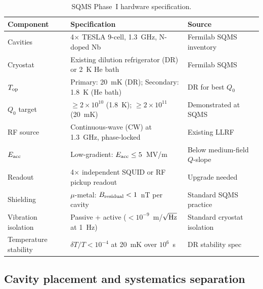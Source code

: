 \documentclass[11pt]{article}
\newcommand{\ee}[1]{\times 10^{#1}}
\theoremstyle{definition}
\theoremstyle{remark}
\begin{document}
\begin{table}[H]
\centering
\caption{SQMS Phase~I hardware specification.}
\label{tab:phase1_hardware}
\renewcommand{\arraystretch}{1.2}
\begin{tabular}{@{}lll@{}}
\toprule
\textbf{Component} & \textbf{Specification} & \textbf{Source} \\
\midrule
Cavities & 4$\times$ TESLA 9-cell, 1.3~GHz, N-doped Nb &
  Fermilab SQMS inventory \\
Cryostat & Existing dilution refrigerator (DR) or 2~K He bath &
  Fermilab SQMS \\
$T_{\rm op}$ & Primary: 20~mK (DR); Secondary: 1.8~K (He bath) &
  DR for best $Q_0$ \\
$Q_0$ target & $\geq 2\ee{10}$ (1.8~K); $\geq 2\ee{11}$ (20~mK) &
  Demonstrated at SQMS \\
RF source & Continuous-wave (CW) at 1.3~GHz, phase-locked &
  Existing LLRF \\
$E_{\rm acc}$ & Low-gradient: $E_{\rm acc} \leq 5$~MV/m &
  Below medium-field $Q$-slope \\
Readout & 4$\times$ independent SQUID or RF pickup readout &
  Upgrade needed \\
Shielding & $\mu$-metal: $B_{\rm residual} < 1$~nT per cavity &
  Standard SQMS practice \\
Vibration isolation & Passive + active ($<10^{-9}$~m/$\sqrt{\rm Hz}$
  at 1~Hz) & Standard cryostat isolation \\
Temperature stability & $\delta T/T < 10^{-4}$ at 20~mK over $10^6$~s &
  DR stability spec \\
\bottomrule
\end{tabular}
\end{table}

\subsection{Cavity placement and systematics separation}
\end{document}
